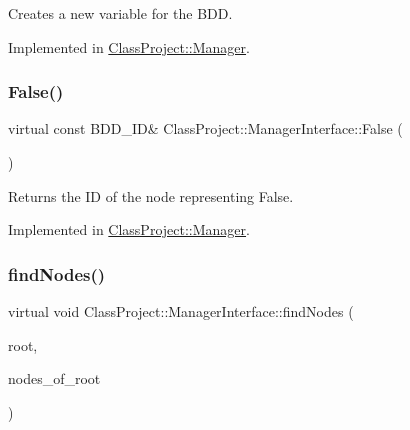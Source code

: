 Creates a new variable for the B\+DD. 

Implemented in \hyperlink{classClassProject_1_1Manager_a9fb480d8af44c75ee2b35b85f7038e68}{Class\+Project\+::\+Manager}.

\mbox{\label{classClassProject_1_1ManagerInterface_a98d18e1bc840fd664af015facfdcf690}} 
\subsubsection{\texorpdfstring{False()}{False()}}
{\footnotesize\ttfamily virtual const B\+D\+D\+\_\+\+ID\& Class\+Project\+::\+Manager\+Interface\+::\+False (\begin{DoxyParamCaption}{ }\end{DoxyParamCaption})\hspace{0.3cm}{\ttfamily [pure virtual]}}

\begin{DoxyReturn}{Returns}
the ID of the node representing False. 
\end{DoxyReturn}


Implemented in \hyperlink{classClassProject_1_1Manager_ae9bae01509e6063313024cd85a8eb569}{Class\+Project\+::\+Manager}.

\mbox{\label{classClassProject_1_1ManagerInterface_ab460e331ffdb85d4128574b3aae72c1e}} 
\subsubsection{\texorpdfstring{find\+Nodes()}{findNodes()}}
{\footnotesize\ttfamily virtual void Class\+Project\+::\+Manager\+Interface\+::find\+Nodes (\begin{DoxyParamCaption}\item[{const B\+D\+D\+\_\+\+ID \&}]{root,  }\item[{std\+::set$<$ B\+D\+D\+\_\+\+ID $>$ \&}]{nodes\+\_\+of\+\_\+root }\end{DoxyParamCaption})\hspace{0.3cm}{\ttfamily [pure virtual]}}

